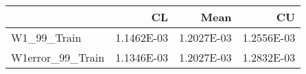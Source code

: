 \begin{tabular}{lrrr}
\toprule
{} &         CL &       Mean &         CU \\
\midrule
W1\_99\_Train      & 1.1462E-03 & 1.2027E-03 & 1.2556E-03 \\
W1error\_99\_Train & 1.1346E-03 & 1.2027E-03 & 1.2832E-03 \\
\bottomrule
\end{tabular}
